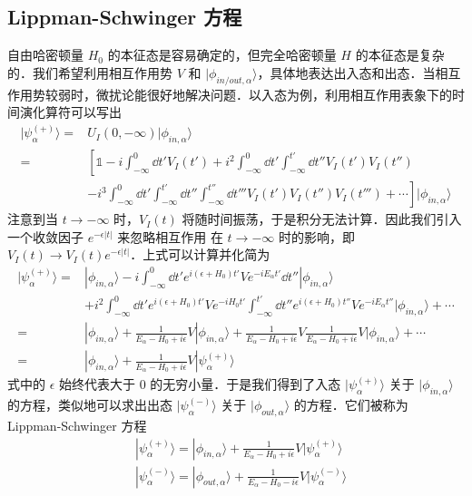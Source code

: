 \subsection{ Lippman-Schwinger 方程}
自由哈密顿量 $H_0$ 的本征态是容易确定的，但完全哈密顿量 $H$ 的本征态是复杂的．我们希望利用相互作用势 $V$ 和 $|\phi_{in/out,\alpha}\rangle$，具体地表达出入态和出态．当相互作用势较弱时，微扰论能很好地解决问题．以入态为例，利用相互作用表象下的时间演化算符可以写出
\begin{equation}
\begin{aligned}
|\psi_\alpha^{(+)}\rangle=&U_I(0,-\infty)|\phi_{in,\alpha}\rangle\\
=&\left[\mathbb{1}-i\int_{-\infty}^0 \dd t' V_I(t')+i^2\int_{-\infty}^0 \dd t'  \int_{-\infty}^{t'} \dd t'' V_I(t')V_I(t'')\right. \\
&\left.-i^3\int_{-\infty}^0 \dd t'  \int_{-\infty}^{t'} \dd t'' \int_{-\infty}^{t''}\dd t''' V_I(t')V_I(t'')V_I(t''')+\cdots\right]|\phi_{in,\alpha}\rangle
\end{aligned}
\end{equation}
注意到当 $t\rightarrow -\infty$ 时，$V_I(t)$ 将随时间振荡，于是积分无法计算．因此我们引入一个收敛因子 $e^{-\epsilon|t|}$ 来忽略相互作用 在 $t\rightarrow -\infty$ 时的影响，即 $V_I(t)\rightarrow V_I(t)e^{-\epsilon|t|}$．上式可以计算并化简为
\begin{equation}
\begin{aligned}
|\psi_\alpha^{(+)}\rangle=&|\phi_{in,\alpha}\rangle-i\int_{-\infty}^0 \dd t' e^{i(\epsilon+H_0) t'} V  e^{-iE_\alpha t'}\dd t''|\phi_{in,\alpha}\rangle \\
&+ i^2\int_{-\infty}^0 \dd t' e^{i(\epsilon+H_0)t'}V e^{-iH_0t'}  \int_{-\infty}^{t'}\dd t'' e^{i(\epsilon+H_0) t''} V e^{-iE_\alpha t''}|\phi_{in,\alpha}\rangle + \cdots\\
=&|\phi_{in,\alpha}\rangle+\frac{1}{E_\alpha-H_0+i\epsilon}V|\phi_{in,\alpha}\rangle+\frac{1}{E_\alpha-H_0+i\epsilon}V\frac{1}{E_\alpha-H_0+i\epsilon}V|\phi_{in,\alpha}\rangle
+\cdots\\
=&|\phi_{in,\alpha}\rangle+\frac{1}{E_\alpha-H_0+i\epsilon}V|\psi_\alpha^{(+)}\rangle
\end{aligned}
\end{equation}
式中的 $\epsilon$ 始终代表大于 $0$ 的无穷小量．于是我们得到了入态 $|\psi_\alpha^{(+)}\rangle$ 关于 $|\phi_{in,\alpha}\rangle$ 的方程，类似地可以求出出态 $|\psi_\alpha^{(-)}\rangle$ 关于 $|\phi_{out,\alpha}\rangle $ 的方程．它们被称为 Lippman-Schwinger 方程
\begin{equation}
\begin{aligned}
&|\psi_\alpha^{(+)}\rangle= |\phi_{in,\alpha}\rangle+\frac{1}{E_\alpha-H_0+i\epsilon}V|\psi_\alpha^{(+)}\rangle\\
&|\psi_\alpha^{(-)}\rangle= |\phi_{out,\alpha}\rangle+\frac{1}{E_\alpha-H_0-i\epsilon}V|\psi_\alpha^{(-)}\rangle
\end{aligned}
\end{equation}
